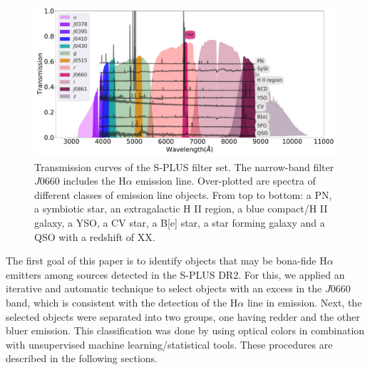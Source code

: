 \documentclass[fleqn,usenatbib]{mnras}
\begin{document}

\begin{figure}
    \includegraphics[width=0.9\linewidth]{Figs/splus-filter.pdf}
    \caption{Transmission curves of the S-PLUS filter set. The narrow-band filter
      $J0660$ includes the H$\alpha$ emission line. Over-plotted are spectra of different
      classes of emission line objects. From top to bottom:  a PN, a symbiotic star, an extragalactic H II region, a blue compact/H II galaxy, a YSO, a CV star, a B[e] star, a star forming galaxy and a QSO with a redshift of XX.}
    \label{fig:curves}
\end{figure}

The first goal of this paper is to identify objects that may be bona-fide H$\alpha$ emitters among sources detected in the S-PLUS DR2.
 For this, we
applied an iterative and automatic technique to select objects with
an excess in the $J0660$ band, which is consistent with the detection of the H{$\alpha$} line in emission. Next, the selected objects were separated
into two groups, one having redder and the other bluer emission. 
This classification was done 
by using optical colors in combination with unsupervised machine learning/statistical tools. These procedures are described 
in the following sections.

\end{document}
